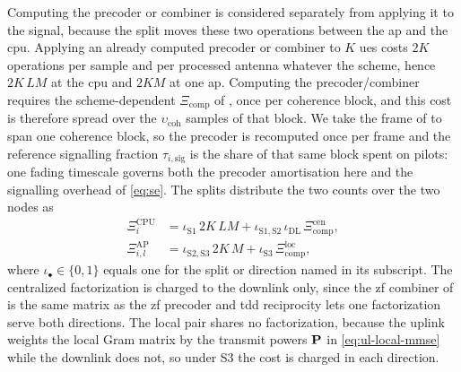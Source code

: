 Computing the precoder or combiner is considered separately from applying it to the signal, because the split moves these two operations between the \gls{ap} and the \gls{cpu}. Applying an already computed precoder or combiner to $K$ \glspl{ue} costs $2K$ operations per sample and per processed antenna whatever the scheme, hence $2K\,LM$ at the \gls{cpu}
and $2KM$ at one \gls{ap}. Computing the precoder/combiner requires the
scheme-dependent $\Xi_{\mathrm{comp}}$ of , once per
coherence block, and this cost is therefore spread over the
$\upsilon_{\mathrm{coh}}$ samples of that block. We take the frame of
 to span one coherence block, so the precoder is recomputed
once per frame and the reference signalling fraction $\tau_{i,\mathrm{sig}}$ is
the share of that same block spent on pilots: one fading timescale governs both
the precoder amortisation here and the signalling overhead of \eqref{eq:se}. The
splits distribute the two counts over the two nodes as
\begin{align}
\label{eq:gops_split}
\Xi^{\mathrm{CPU}}_{i} &= \iota_{\mathrm{S1}}\,2K\,LM
+ \iota_{\mathrm{S1,S2}}\,\iota_{\mathrm{DL}}\,\Xi_{\mathrm{comp}}^{\mathrm{cen}},\\
\Xi_{i,l}^{\mathrm{AP}} &= \iota_{\mathrm{S2,S3}}\,2K\,M
+ \iota_{\mathrm{S3}}\,\Xi_{\mathrm{comp}}^{\mathrm{loc}},
\end{align}
where $\iota_{\bullet}\in\{0,1\}$ equals one for the split or direction named in
its subscript. The centralized factorization is charged to the downlink only, since the \gls{zf} combiner of  is the same matrix as the \gls{zf} precoder and \gls{tdd}
reciprocity lets one factorization serve both directions. The local pair shares
no factorization, because the uplink weights the local Gram matrix by the
transmit powers $\boldsymbol{\mathrm{P}}$ in \eqref{eq:ul-local-mmse} while the downlink does
not, so under S3 the cost is charged in each direction.

